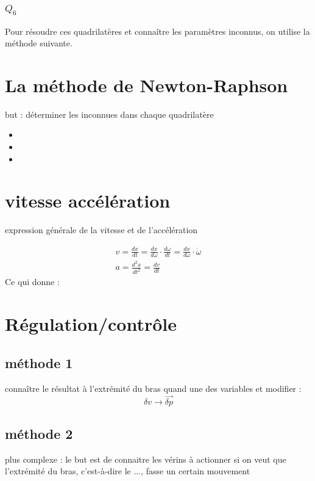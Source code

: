 \documentclass[12pt,a4paper,twoside]{article}
\begin{document}
\subsubsection{$Q_6$}

Pour résoudre ces quadrilatères et connaître les paramètres inconnus, on utilise la méthode suivante. 
\newpage
\section{La méthode de Newton-Raphson}
but : déterminer les inconnues dans chaque quadrilatère

\begin{itemize}
	\item 
	\item 
	\item 
\end{itemize}


\section{vitesse accélération}


expression générale de la vitesse et de l'accélération

\begin{eqnarray}
v=\frac{d x}{dt}=\frac{d x}{d \omega} \cdot \frac{d \omega}{dt}=\frac{d x}{d \omega} \cdot \dot{\omega}\\
a=\frac{d^2 x}{dt^2}=\frac{dv}{dt}
\end{eqnarray}
Ce qui donne : 


\section{Régulation/contrôle}

\subsection{méthode 1}
connaître le résultat à l'extrémité du bras quand une des variables et modifier : 
\begin{equation}
\delta v \rightarrow \vec{\delta p}
\end{equation}

\subsection{méthode 2}
plus complexe : 
le but est de connaitre les vérins à actionner si on veut que l'extrémité du bras, c'est-à-dire le ..., fasse un certain mouvement
\end{document}
